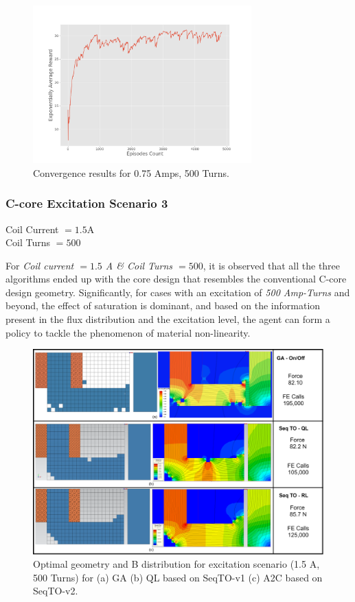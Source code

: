 \begin{figure}[h!]
    \centering
    \includegraphics[width=0.75\textwidth]{Figures/Ch_RL/0.75A_RL.png}
    \caption{Convergence results for 0.75 Amps, 500 Turns.}
    \label{fig:RL_convergence_75Amps}
\end{figure}

\subsubsection{C-core Excitation Scenario 3}
Coil Current $= 1.5 $A \\Coil Turns $= 500$ 

For \textit{Coil current $= 1.5$ A \& Coil  Turns $= 500$}, it is observed that all the three algorithms ended up with the core design that resembles the conventional C-core design geometry. Significantly, for cases with an excitation of \textit{500 Amp-Turns} and beyond, the effect of saturation is dominant, and based on the information present in the flux distribution and the excitation level, the agent can form a policy to tackle the phenomenon of material non-linearity.

\begin{figure}[h!]
    \centering
    \includegraphics[width=\textwidth]{Figures/Ch_RL/Ccore_1.5A.png}
    \caption{Optimal geometry and B distribution for excitation scenario (1.5 A, 500 Turns) for (a) GA (b) QL based on SeqTO-v1 (c) A2C based on SeqTO-v2.}
    \label{fig:RL_Ccore_1.5A_GeoNB}
\end{figure}

